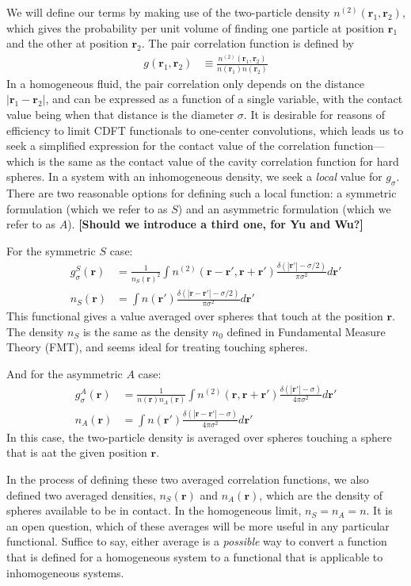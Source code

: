 \documentclass[letterpaper,twocolumn,amsmath,amssymb,jcp,10pt,aip]{revtex4-1}
\newcommand{\red}[1]{{\bf \color{red} #1}}
\newcommand{\rr}{\textbf{r}}
\newcommand{\fixme}[1]{\red{[#1]}}
\begin{document}
We will define our terms by making use of the two-particle density
$n^{(2)}(\rr_1,\rr_2)$, which gives the probability per unit volume of
finding one particle at position $\rr_1$ and the other at position
$\rr_2$.  The pair correlation function is defined by
\begin{align}
  g(\rr_1,\rr_2) &\equiv \frac{n^{(2)}(\rr_1,\rr_2)}{n(\rr_1)n(\rr_2)}
\end{align}
In a homogeneous fluid, the pair correlation only depends on the
distance $|\rr_1-\rr_2|$, and can be expressed as a function of a
single variable, with the contact value being when that distance is
the diameter $\sigma$.  It is desirable for reasons of efficiency to limit CDFT
functionals to one-center convolutions, which leads us to seek a
simplified expression for the contact value of the correlation
function---which is the same as the contact value of the cavity
correlation function for hard spheres.
In a system with an inhomogeneous density, we seek a \emph{local}
value for $g_\sigma$.  There are two reasonable options for defining
such a local function: a symmetric formulation (which we refer to as $S$) and an
asymmetric formulation (which we refer to as $A$). \fixme{Should we
  introduce a third one, for Yu and Wu?}

For the symmetric $S$ case:
\begin{align}
  g^S_\sigma(\rr) &= \frac{1}{n_S(\rr)^2}\int n^{(2)}(\rr - \rr', \rr
  + \rr')
  \frac{\delta(|\rr'| -\sigma/2)}{\pi\sigma^2}d\rr' \\
  n_S(\rr) &= \int n(\rr')\frac{\delta(|\rr-\rr'|-\sigma/2)}{\pi\sigma^2} d\rr'
\end{align}
This functional gives a value averaged over spheres that touch at the
position $\rr$.  The density $n_S$ is the same as the density $n_0$
defined in Fundamental Measure Theory (FMT), and seems ideal for
treating touching spheres.

And for the asymmetric $A$ case:
\begin{align}
  g^A_\sigma(\rr) &= \frac{1}{n(\rr)n_A(\rr)}
  \int n^{(2)}(\rr, \rr + \rr')
  \frac{\delta(|\rr'| - \sigma)}{4\pi\sigma^2}d\rr' \\
  n_A(\rr) &= \int n(\rr')
  \frac{\delta(|\rr-\rr'|-\sigma)}{4\pi\sigma^2} d\rr'
\end{align}
In this case, the two-particle density is averaged over spheres
touching a sphere that is aat the given position $\rr$.

In the process of defining these two averaged correlation functions,
we also defined two averaged densities, $n_S(\rr)$ and $n_A(\rr)$,
which are the density of spheres available to be in
contact.  In the homogeneous limit, $n_S = n_A = n$.  It is an
open question, which of these averages will be more useful in any
particular functional.  Suffice to say, either average is a
\emph{possible} way to convert a function that is defined for a
homogeneous system to a functional that is applicable to inhomogeneous
systems.
\end{document}
